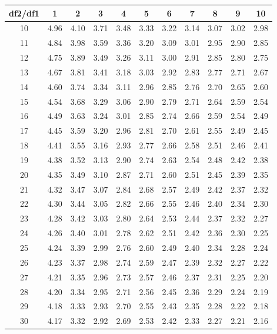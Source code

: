 \documentclass[
]{book}
\theoremstyle{definition}
\theoremstyle{definition}
\theoremstyle{definition}
\theoremstyle{definition}
\theoremstyle{remark}
\begin{document}
\begin{longtable}[]{@{}ccccccccccc@{}}
\toprule()
df2/df1 & 1 & 2 & 3 & 4 & 5 & 6 & 7 & 8 & 9 & 10 \\
\midrule()
\endhead
10 & 4.96 & 4.10 & 3.71 & 3.48 & 3.33 & 3.22 & 3.14 & 3.07 & 3.02 & 2.98 \\
11 & 4.84 & 3.98 & 3.59 & 3.36 & 3.20 & 3.09 & 3.01 & 2.95 & 2.90 & 2.85 \\
12 & 4.75 & 3.89 & 3.49 & 3.26 & 3.11 & 3.00 & 2.91 & 2.85 & 2.80 & 2.75 \\
13 & 4.67 & 3.81 & 3.41 & 3.18 & 3.03 & 2.92 & 2.83 & 2.77 & 2.71 & 2.67 \\
14 & 4.60 & 3.74 & 3.34 & 3.11 & 2.96 & 2.85 & 2.76 & 2.70 & 2.65 & 2.60 \\
15 & 4.54 & 3.68 & 3.29 & 3.06 & 2.90 & 2.79 & 2.71 & 2.64 & 2.59 & 2.54 \\
16 & 4.49 & 3.63 & 3.24 & 3.01 & 2.85 & 2.74 & 2.66 & 2.59 & 2.54 & 2.49 \\
17 & 4.45 & 3.59 & 3.20 & 2.96 & 2.81 & 2.70 & 2.61 & 2.55 & 2.49 & 2.45 \\
18 & 4.41 & 3.55 & 3.16 & 2.93 & 2.77 & 2.66 & 2.58 & 2.51 & 2.46 & 2.41 \\
19 & 4.38 & 3.52 & 3.13 & 2.90 & 2.74 & 2.63 & 2.54 & 2.48 & 2.42 & 2.38 \\
20 & 4.35 & 3.49 & 3.10 & 2.87 & 2.71 & 2.60 & 2.51 & 2.45 & 2.39 & 2.35 \\
21 & 4.32 & 3.47 & 3.07 & 2.84 & 2.68 & 2.57 & 2.49 & 2.42 & 2.37 & 2.32 \\
22 & 4.30 & 3.44 & 3.05 & 2.82 & 2.66 & 2.55 & 2.46 & 2.40 & 2.34 & 2.30 \\
23 & 4.28 & 3.42 & 3.03 & 2.80 & 2.64 & 2.53 & 2.44 & 2.37 & 2.32 & 2.27 \\
24 & 4.26 & 3.40 & 3.01 & 2.78 & 2.62 & 2.51 & 2.42 & 2.36 & 2.30 & 2.25 \\
25 & 4.24 & 3.39 & 2.99 & 2.76 & 2.60 & 2.49 & 2.40 & 2.34 & 2.28 & 2.24 \\
26 & 4.23 & 3.37 & 2.98 & 2.74 & 2.59 & 2.47 & 2.39 & 2.32 & 2.27 & 2.22 \\
27 & 4.21 & 3.35 & 2.96 & 2.73 & 2.57 & 2.46 & 2.37 & 2.31 & 2.25 & 2.20 \\
28 & 4.20 & 3.34 & 2.95 & 2.71 & 2.56 & 2.45 & 2.36 & 2.29 & 2.24 & 2.19 \\
29 & 4.18 & 3.33 & 2.93 & 2.70 & 2.55 & 2.43 & 2.35 & 2.28 & 2.22 & 2.18 \\
30 & 4.17 & 3.32 & 2.92 & 2.69 & 2.53 & 2.42 & 2.33 & 2.27 & 2.21 & 2.16 \\

\end{longtable}
\end{document}
